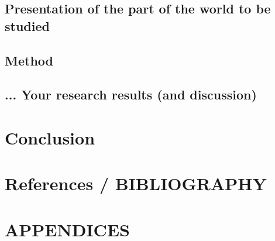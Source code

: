   \section{Presentation of the part of the world to be studied}
    

  \section{Method}

  
  \section{... Your research results (and discussion)}


\chapter{Conclusion}

  
\chapter{References / BIBLIOGRAPHY}


\chapter{APPENDICES}




